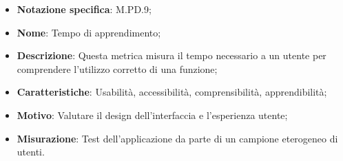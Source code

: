 \begin{itemize}
    \item \textbf{Notazione specifica}: M.PD.9;
    \item \textbf{Nome}: Tempo di apprendimento;
    \item \textbf{Descrizione}: Questa metrica misura il tempo necessario a un utente per comprendere l'utilizzo corretto di una funzione;
    \item \textbf{Caratteristiche}: Usabilità, accessibilità, comprensibilità, apprendibilità;
    \item \textbf{Motivo}: Valutare il design dell'interfaccia e l'esperienza utente;
    \item \textbf{Misurazione}: Test dell'applicazione da parte di un campione eterogeneo di utenti.
\end{itemize}
